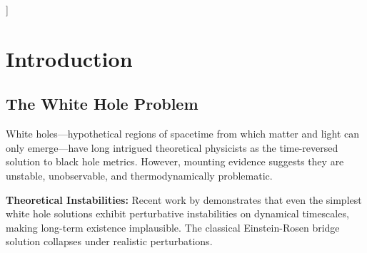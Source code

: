 \documentclass[11pt,a4paper,twocolumn]{article}
\begin{document}
\begin{@twocolumnfalse}
\begin{abstract}
\section*{Zusammenfassung}
\noindent Weiße Löcher, die zeitumgekehrten Gegenstücke zu Schwarzen Löchern, leiden unter fundamentalen Stabilitätsproblemen und fehlen jeglicher Beobachtungsgrundlage. Wir schlagen eine Alternative im Rahmen des UTAC-Frameworks (Universal Threshold Adaptive Criticality) vor: \textbf{metastabile Sternhaufen als verteilte resonante Entropie-Rückgabeknoten}. Anstelle singulärer Raumzeit-Inversionen fungieren galaktische offene Haufen (OCs) und Kugelsternhaufen (GCs) als asynchrone, räumlich ausgedehnte Strukturen, die Entropie und Masse-Energie durch Gezeitenauflösung und stellares Feedback recyceln. Dieses Modell erklärt natürlich: (1) die kosmische Dipolanomalie ($v_{\text{obs}} = 1370 \pm 170$ km/s vs. $v_{\text{RIG}} \approx 1.352$ km/s aus UTAC-Dimensionalität), (2) asymmetrische Gezeitenschweife in Gaia DR3 (19 OCs mit bevorzugten Trailing-Strukturen), und (3) unerwartet reife Hochrotverschiebungs-Protocluster (JWST A2744-z7p9OD bei $z \approx 7.9$). Wir implementieren dies als \textbf{Resonant Return Layer} in NeuroProfile v11 mit falsifizierbaren Vorhersagen via logistische $\beta$-Fits ($\beta > 7$ in aktiven Haufen), Nullmodell-Vergleichen ($\Delta$AIC $\geq 10$ für Kritikalität) und Bootstrap-Konfidenzintervallen. Im Gegensatz zu Weißen Löchern ist dieser Ansatz thermodynamisch konservativ, beobachtungsbasiert und rechnerisch testbar.
\end{abstract}

\end{@twocolumnfalse}
]

\section{Introduction}

\subsection{The White Hole Problem}

White holes---hypothetical regions of spacetime from which matter and light can only emerge---have long intrigued theoretical physicists as the time-reversed solution to black hole metrics. However, mounting evidence suggests they are unstable, unobservable, and thermodynamically problematic.

\textbf{Theoretical Instabilities:} Recent work by \citet{gaur2024} demonstrates that even the simplest white hole solutions exhibit perturbative instabilities on dynamical timescales, making long-term existence implausible. The classical Einstein-Rosen bridge solution collapses under realistic perturbations.
\end{document}

